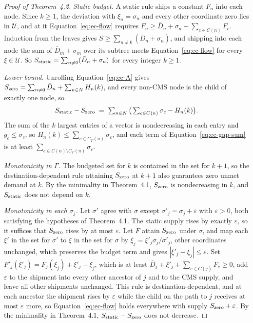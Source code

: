 \documentclass[11pt]{article}
\begin{document}
\begin{proof}[Proof of Theorem~4.2]
\emph{Static budget.}
A static rule ships a constant $F_n$ into each node.
Since $k \ge 1$, the deviation with $\xi_n = \sigma_n$ and every other coordinate zero lies in $\mathcal U$, and at it Equation~\ref{eq:ec-flow} requires $F_n \ge \bar D_n + \sigma_n + \sum_{c \in C(n)} F_c$.
Induction from the leaves gives $S \ge \sum_{n \neq 0} (\bar D_n + \sigma_n)$, and shipping into each node the sum of $\bar D_m + \sigma_m$ over its subtree meets Equation~\ref{eq:ec-flow} for every $\xi \in \mathcal U$.
So $S_{\rm static} = \sum_{n \neq 0} (\bar D_n + \sigma_n)$ for every integer $k \ge 1$.

\emph{Lower bound.}
Unrolling Equation~\ref{eq:ec-A} gives $S_{\rm zero} = \sum_{n \neq 0} \bar D_n + \sum_{n \in N} H_n(k)$, and every non-CMS node is the child of exactly one node, so
\begin{equation}
S_{\rm static} - S_{\rm zero} \;=\; \textstyle\sum_{n \in N} \big( \sum_{c \in C(n)} \sigma_c - H_n(k) \big).
\label{eq:ec-gap-sum}
\end{equation}
The sum of the $k$ largest entries of a vector is nondecreasing in each entry and $g_c \le \sigma_c$, so $H_n(k) \le \sum_{c \in C_\Gamma(n)} \sigma_c$, and each term of Equation~\ref{eq:ec-gap-sum} is at least $\sum_{c \in C(n) \setminus C_\Gamma(n)} \sigma_c$.

\emph{Monotonicity in $\Gamma$.}
The budgeted set for $k$ is contained in the set for $k+1$, so the destination-dependent rule attaining $S_{\rm zero}$ at $k+1$ also guarantees zero unmet demand at $k$.
By the minimality in Theorem~4.1, $S_{\rm zero}$ is nondecreasing in $k$, and $S_{\rm static}$ does not depend on $k$.

\emph{Monotonicity in each $\sigma_j$.}
Let $\sigma'$ agree with $\sigma$ except $\sigma'_j = \sigma_j + \varepsilon$ with $\varepsilon > 0$, both satisfying the hypotheses of Theorem~4.1.
The static supply rises by exactly $\varepsilon$, so it suffices that $S_{\rm zero}$ rises by at most $\varepsilon$.
Let $F$ attain $S_{\rm zero}$ under $\sigma$, and map each $\xi'$ in the set for $\sigma'$ to $\xi$ in the set for $\sigma$ by $\xi_j = \xi'_j \sigma_j/\sigma'_j$, other coordinates unchanged, which preserves the budget term and gives $|\xi'_j - \xi_j| \le \varepsilon$.
Set $F'_j(\xi'_j) = F_j(\xi_j) + \xi'_j - \xi_j$, which is at least $\bar D_j + \xi'_j + \sum_{c \in C(j)} F_c \ge 0$, add $\varepsilon$ to the shipment into every other ancestor of $j$ and to the CMS supply, and leave all other shipments unchanged.
This rule is destination-dependent, and at each ancestor the shipment rises by $\varepsilon$ while the child on the path to $j$ receives at most $\varepsilon$ more, so Equation~\ref{eq:ec-flow} holds everywhere with supply $S_{\rm zero} + \varepsilon$.
By the minimality in Theorem~4.1, $S_{\rm static} - S_{\rm zero}$ does not decrease.
\end{proof}
\end{document}
